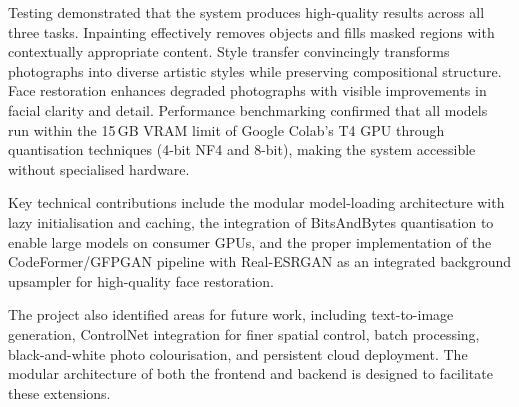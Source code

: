 \documentclass[12pt,a4paper]{report}
\begin{document}
Testing demonstrated that the system produces high-quality results across all three tasks. Inpainting effectively removes objects and fills masked regions with contextually appropriate content. Style transfer convincingly transforms photographs into diverse artistic styles while preserving compositional structure. Face restoration enhances degraded photographs with visible improvements in facial clarity and detail. Performance benchmarking confirmed that all models run within the 15\,GB VRAM limit of Google Colab's T4 GPU through quantisation techniques (4-bit NF4 and 8-bit), making the system accessible without specialised hardware.

Key technical contributions include the modular model-loading architecture with lazy initialisation and caching, the integration of BitsAndBytes quantisation to enable large models on consumer GPUs, and the proper implementation of the CodeFormer/GFPGAN pipeline with Real-ESRGAN as an integrated background upsampler for high-quality face restoration.

The project also identified areas for future work, including text-to-image generation, ControlNet integration for finer spatial control, batch processing, black-and-white photo colourisation, and persistent cloud deployment. The modular architecture of both the frontend and backend is designed to facilitate these extensions.

\newpage

{}


\end{document}
